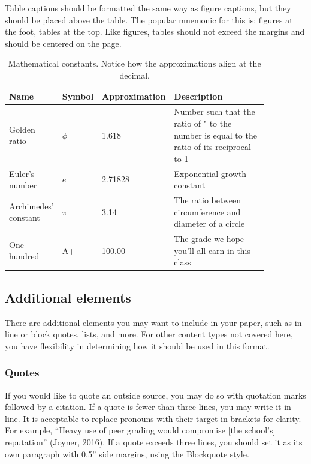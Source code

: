 \documentclass[
	letterpaper, %
]{jdf}
\begin{document}
Table captions should be formatted the same way as figure captions, but they should be placed above the table. The popular mnemonic for this is: figures at the foot, tables at the top. Like figures, tables should not exceed the margins and should be centered on the page.

\begin{table}[h] %
	\caption{Mathematical constants. Notice how the approximations align at the decimal.}
	\small %
	\centering %
	\begin{tabular}{L{0.17\linewidth} C{0.12\linewidth} L{0.17\linewidth} L{0.4\linewidth}}
		\textbf{Name} & \textbf{Symbol} & \textbf{Approximation} & \textbf{Description} \\
		\toprule[0.5pt]
		Golden ratio & $\phi$ & 1.618 & Number such that the ratio of " to the number is equal to the ratio of its reciprocal to 1\\
		\midrule
		Euler's number & $e$ & 2.71828 & Exponential growth constant\\
		\midrule
		Archimedes' constant & $\pi$ & 3.14 & The ratio between circumference and diameter of a circle\\
		\midrule
		One hundred & A+ & 100.00 & The grade we hope you’ll all earn in this class\\
	\end{tabular}
\end{table}

\subsection{Additional elements}
There are additional elements you may want to include in your paper, such as in-line or block quotes, lists, and more. For other content types not covered here, you have flexibility in determining how it should be used in this format.

\subsubsection{Quotes}
If you would like to quote an outside source, you may do so with quotation marks followed by a citation. If a quote is fewer than three lines, you may write it in-line. It is acceptable to replace pronouns with their target in brackets for clarity. For example, “Heavy use of peer grading would compromise [the school’s] reputation” (Joyner, 2016). If a quote exceeds three lines, you should set it as its own paragraph with 0.5” side margins, using the Blockquote style.
\end{document}
